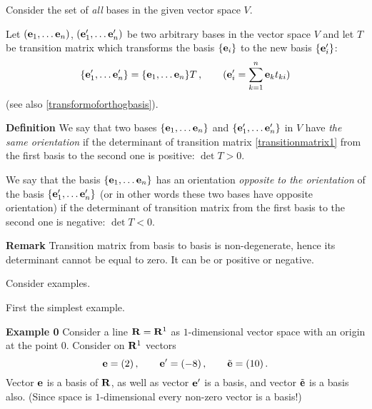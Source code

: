 \documentclass[12pt]{article}
\numberwithin{equation}{section}
\begin{document}


   \bigskip
Consider the set of {\it all} bases in the  given vector space  $V$.


 Let  $({\bf e}_1,\dots{\bf e}_n)$, $({\bf e}'_1,\dots{\bf e}'_n)$ be two arbitrary bases in the vector space $V$
 and let $T$ be transition matrix
  which transforms the basis $\{{\bf e}_i\}$ to the new  basis $\{{\bf e}'_i\}$:
\begin{equation}\label{transitionmatrix1}
    \{{\bf e}'_1,\dots{\bf e}'_n\}=\{{\bf e}_1,\dots{\bf e}_n\}T\,,\qquad ({\bf e}'_i=\sum_{k=1}^n{\bf e}_k t_{ki})
\end{equation}
(see also \eqref{transformoforthogbasis}).




  {\bf Definition}
   We say that two bases
 $\{{\bf e}_1,\dots{\bf e}_n\}$ and $\{{\bf e}'_1,\dots{\bf e}'_n\}$ in $V$
   have {\it the same orientation}
  if  the determinant of transition matrix \eqref{transitionmatrix1} from the first basis to the second one is positive:
  $\det T>0$.

\smallskip

  \noindent We say that the basis $\{{\bf e}_1,\dots{\bf e}_n\}$ has an orientation
  {\it opposite to the orientation} of the basis $\{{\bf e}'_1,\dots{\bf e}'_n\}$
  (or in other words these two bases have opposite orientation)
  if the determinant of transition matrix from the first basis to the second one is negative: $\det T<0$.

{\bf Remark} Transition matrix from basis to basis is non-degenerate, hence its determinant cannot be equal to zero.
 It can be or positive or negative.



\smallskip

Consider examples.

\smallskip

First the simplest example.

{\bf Example 0} Consider a line
 ${\bf R}={\bf R}^1$ as  $1$-dimensional vector space with an origin at the point
  $0$. Consider on ${\bf R}^1$ vectors
       $$
{\bf e}=(2)\,,\qquad
{\bf e}'=(-8)\,,\qquad
\tilde {{\bf e}}=(10)\,.
       $$
Vector ${\bf e}$ is a basis of ${\bf R}$, as well as vector
 ${\bf e}'$ is a basis, and vector $\tilde{{\bf e}}$ is a basis also.
(Since space is $1$-dimensional every 
non-zero vector is a basis!)
\end{document}
